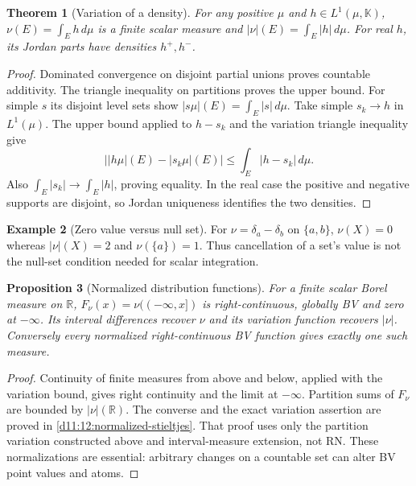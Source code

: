 \documentclass[11pt,oneside,openany]{book}
\newtheorem{theorem}{Theorem}[chapter]
\newtheorem{proposition}[theorem]{Proposition}
\theoremstyle{definition}
\newtheorem{example}[theorem]{Example}
\theoremstyle{remark}
\newcommand{\R}{\mathbb R}\newcommand{\C}{\mathbb C}
\newcommand{\family}[1]{}
\begin{document}
\begin{theorem}[Variation of a density]\family{D11.14.density_measure_variation}\label{d11:14:density-measure-variation}
For any positive $\mu$ and $h\in L^1(\mu,\mathbb K)$,
$\nu(E)=\int_Eh\,d\mu$ is a finite scalar measure and
$|\nu|(E)=\int_E|h|\,d\mu$. For real $h$, its Jordan parts have densities
$h^+,h^-$.
\end{theorem}
\begin{proof}
Dominated convergence on disjoint partial unions proves countable
additivity. The triangle inequality on partitions proves the upper bound.
For simple $s$ its disjoint level sets show $|s\mu|(E)=\int_E|s|\,d\mu$.
Take simple $s_k\to h$ in $L^1(\mu)$. The upper bound applied to $h-s_k$
and the variation triangle inequality give
\[
 \big||h\mu|(E)-|s_k\mu|(E)\big|\leq\int_E|h-s_k|\,d\mu.
\]
Also $\int_E|s_k|\to\int_E|h|$, proving equality. In the real case the
positive and negative supports are disjoint, so Jordan uniqueness identifies
the two densities.
\end{proof}

\begin{example}[Zero value versus null set]\family{D11.14.zero_set_not_null}\label{d11:14:zero-set-not-null}
For $\nu=\delta_a-\delta_b$ on $\{a,b\}$, $\nu(X)=0$ whereas
$|\nu|(X)=2$ and $\nu(\{a\})=1$. Thus cancellation of a set's value is
not the null-set condition needed for scalar integration.
\end{example}

\begin{proposition}[Normalized distribution functions]\family{D11.14.normalized_measure_function_bridge}\label{d11:14:normalized-measure-function-bridge}
For a finite scalar Borel measure on $\R$,
$F_\nu(x)=\nu(( -\infty,x])$ is right-continuous, globally BV and zero
at $-\infty$. Its interval differences recover $\nu$ and its variation
function recovers $|\nu|$. Conversely every normalized right-continuous BV
function gives exactly one such measure.
\end{proposition}
\begin{proof}
Continuity of finite measures from above and below, applied with the
variation bound, gives right continuity and the limit at $-\infty$.
Partition sums of $F_\nu$ are bounded by $|\nu|(\R)$. The converse and the
exact variation assertion are proved in
\cref{d11:12:normalized-stieltjes}. That proof uses only the partition
variation constructed above and interval-measure extension, not RN. These
normalizations are essential: arbitrary changes on a countable set can
alter BV point values and atoms.
\end{proof}
\end{document}
